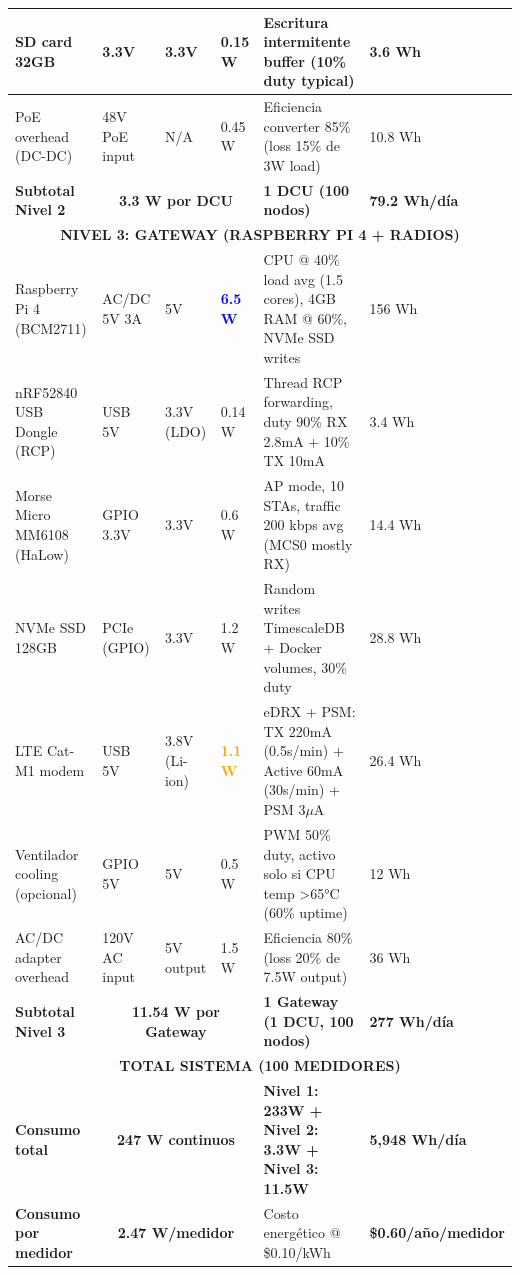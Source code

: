 \begin{table}[H]
{\begin{tabular}{|p{3cm}|p{2.5cm}|p{2cm}|p{2cm}|p{4.5cm}|p{2cm}|}
\hline
SD card 32GB & 3.3V & 3.3V & 0.15 W & Escritura intermitente buffer (10\% duty typical) & 3.6 Wh \\
\hline
PoE overhead (DC-DC) & 48V PoE input & N/A & 0.45 W & Eficiencia converter 85\% (loss 15\% de 3W load) & 10.8 Wh \\
\hline
\rowcolor{yellow!10}
\textbf{Subtotal Nivel 2} & \multicolumn{3}{c|}{\textbf{3.3 W por DCU}} & \textbf{1 DCU (100 nodos)} & \textbf{79.2 Wh/día} \\
\hline
\multicolumn{6}{|c|}{\cellcolor{orange!20}\textbf{NIVEL 3: GATEWAY (RASPBERRY PI 4 + RADIOS)}} \\
\hline
Raspberry Pi 4 (BCM2711) & AC/DC 5V 3A & 5V & \textcolor{blue}{\textbf{6.5 W}} & CPU @ 40\% load avg (1.5 cores), 4GB RAM @ 60\%, NVMe SSD writes & 156 Wh \\
\hline
nRF52840 USB Dongle (RCP) & USB 5V & 3.3V (LDO) & 0.14 W & Thread RCP forwarding, duty 90\% RX 2.8mA + 10\% TX 10mA & 3.4 Wh \\
\hline
Morse Micro MM6108 (HaLow) & GPIO 3.3V & 3.3V & 0.6 W & AP mode, 10 STAs, traffic 200 kbps avg (MCS0 mostly RX) & 14.4 Wh \\
\hline
NVMe SSD 128GB & PCIe (GPIO) & 3.3V & 1.2 W & Random writes TimescaleDB + Docker volumes, 30\% duty & 28.8 Wh \\
\hline
LTE Cat-M1 modem & USB 5V & 3.8V (Li-ion) & \textcolor{orange}{\textbf{1.1 W}} & eDRX + PSM: TX 220mA (0.5s/min) + Active 60mA (30s/min) + PSM 3$\mu$A & 26.4 Wh \\
\hline
Ventilador cooling (opcional) & GPIO 5V & 5V & 0.5 W & PWM 50\% duty, activo solo si CPU temp >65°C (60\% uptime) & 12 Wh \\
\hline
AC/DC adapter overhead & 120V AC input & 5V output & 1.5 W & Eficiencia 80\% (loss 20\% de 7.5W output) & 36 Wh \\
\hline
\rowcolor{yellow!10}
\textbf{Subtotal Nivel 3} & \multicolumn{3}{c|}{\textbf{11.54 W por Gateway}} & \textbf{1 Gateway (1 DCU, 100 nodos)} & \textbf{277 Wh/día} \\
\hline
\multicolumn{6}{|c|}{\cellcolor{red!20}\textbf{TOTAL SISTEMA (100 MEDIDORES)}} \\
\hline
\rowcolor{blue!10}
\textbf{Consumo total} & \multicolumn{3}{c|}{\textbf{247 W continuos}} & \textbf{Nivel 1: 233W + Nivel 2: 3.3W + Nivel 3: 11.5W} & \textbf{5,948 Wh/día} \\
\hline
\textbf{Consumo por medidor} & \multicolumn{3}{c|}{\textbf{2.47 W/medidor}} & Costo energético @ \$0.10/kWh & \textbf{\$0.60/año/medidor} \\
\hline
\end{tabular}%
}
\end{table}

